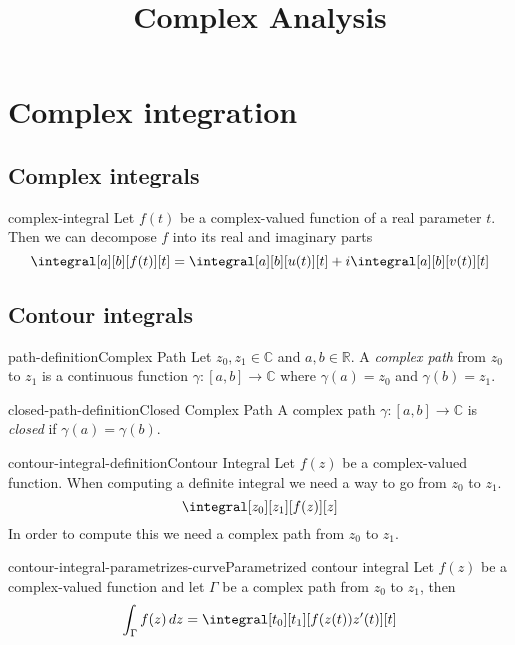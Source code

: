 \documentclass[preview]{standalone}
\begin{document}
  
\title{Complex Analysis}
\genpage

\section{Complex integration}

\subsection{Complex integrals}

\begin{snippet}{complex-integral}
Let \(f(t)\) be a complex-valued function of a real parameter \(t\). Then
we can decompose \(f\) into its real and imaginary parts
\[
    \integral[a][b][f(t)][t]=\integral[a][b][u(t)][t]+i\integral[a][b][v(t)][t]
\]
\end{snippet}

\subsection{Contour integrals}

\begin{snippetdefinition}{path-definition}{Complex Path}{
    Let \(z_0, z_1 \in \mathbb{C}\) and \(a,b\in \mathbb{R}\).
    A \textit{complex path} from \(z_0\) to \(z_1\) is a continuous function
    \(\gamma\colon [a,b] \to \mathbb{C}\) where \(\gamma(a)=z_0\) and \(\gamma(b)=z_1\).
}
\end{snippetdefinition}

\begin{snippetdefinition}{closed-path-definition}{Closed Complex Path}{
    A complex path \(\gamma\colon [a,b] \to \mathbb{C}\)
    is \textit{closed} if \(\gamma(a)=\gamma(b)\).
}
\end{snippetdefinition}


\begin{snippetdefinition}{contour-integral-definition}{Contour Integral}{
    Let \(f(z)\) be a complex-valued function.
    When computing a definite integral we need a way to go from \(z_0\) to \(z_1\).
    \[
        \integral[z_0][z_1][f(z)][z]
    \]
    In order to compute this we need a complex path from \(z_0\) to \(z_1\).
}
\end{snippetdefinition}


\begin{snippettheorem}{contour-integral-parametrizes-curve}{Parametrized contour integral}{
    Let \(f(z)\) be a complex-valued function and
    let \(\Gamma\) be a complex path from \(z_0\) to \(z_1\), then
    \[
        \int_\Gamma f(z)\,dz = \integral[t_0][t_1][f(z(t))z'(t)][t]
    \]
}
\end{snippettheorem}

\end{document}
